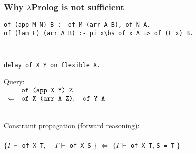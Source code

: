 \documentclass{beamer}
\newcommand{\bs}{\textbackslash\,}
\begin{document}
\begin{frame}[fragile]
 \frametitle{Why $\lambda$Prolog is not sufficient}
\begin{verbatim}
of (app M N) B :- of M (arr A B), of N A.
of (lam F) (arr A B) :- pi x\bs of x A => of (F x) B.
\end{verbatim}\\


\pause

\begin{verbatim}
delay of X Y on flexible X.
\end{verbatim}

Query:\\
$\begin{array}{ll}
 & \verb+of (app X Y) Z+\\
 \Leftarrow & \mbox{\texttt{of X (arr A Z)}},\quad \mbox{\texttt{of Y A}}
\end{array}$


 \pause

 ~\\\alert{Constraint propagation (forward reasoning)}:\\~\\

 $\{ \Gamma \vdash $ \verb+of X T+, $\quad \Gamma \vdash $ \verb+of X S+ $\}$
 $\iff$
 $\{ \Gamma \vdash $ \verb+of X T+, \verb+S = T+ $\}$

\vspace{10cm}

~

\end{frame}
\end{document}
